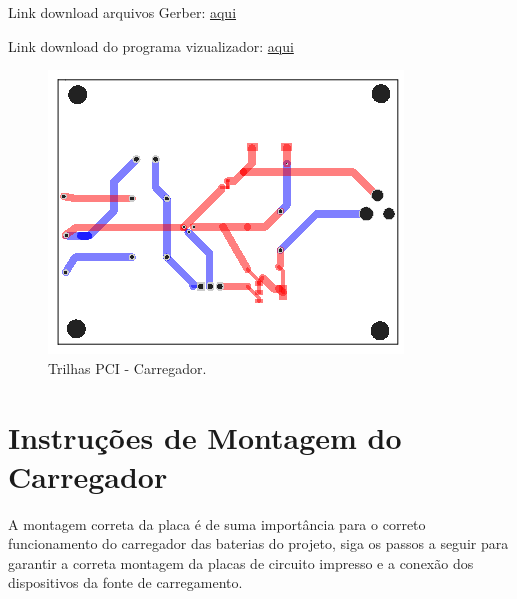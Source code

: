 \par Link download arquivos Gerber: \href {https://drive.google.com/drive/folders/1P1pQGE_zuSLOB5qd8zfESWqLDwtyoRKd?usp=sharing}{aqui}
\par Link download do programa vizualizador: \href{https://sourceforge.net/projects/gerbv/files/}{aqui} 

\begin{figure}[H]
  \centering
  \includegraphics[width=\textwidth]{Figuras/Carregador/PCB_PCB_2020-11-10_21-13-48_2020-11-20_03-04-03.png}
  \caption{Trilhas PCI - Carregador.} 
  \label{trilha-carregador}
\end{figure}

\newpage

\section{Instruções de Montagem do Carregador}

\par A montagem correta da placa é de suma importância para o correto funcionamento do carregador das baterias do projeto, siga os passos a seguir para garantir a correta montagem da placas de circuito impresso e a conexão dos dispositivos da fonte de carregamento.

